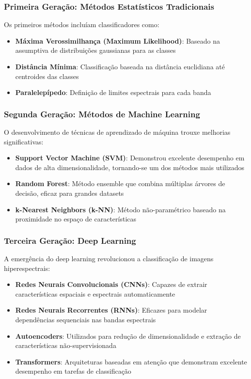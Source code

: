 \subsubsection{Primeira Geração: Métodos Estatísticos Tradicionais}
Os primeiros métodos incluíam classificadores como:
\begin{itemize}
    \item \textbf{Máxima Verossimilhança (Maximum Likelihood)}: Baseado na assumptiva de distribuições gaussianas para as classes
    \item \textbf{Distância Mínima}: Classificação baseada na distância euclidiana até centroides das classes
    \item \textbf{Paralelepípedo}: Definição de limites espectrais para cada banda
\end{itemize}

\subsubsection{Segunda Geração: Métodos de Machine Learning}
O desenvolvimento de técnicas de aprendizado de máquina trouxe melhorias significativas:
\begin{itemize}
    \item \textbf{Support Vector Machine (SVM)}: Demonstrou excelente desempenho em dados de alta dimensionalidade, tornando-se um dos métodos mais utilizados \cite{Lou2024}
    \item \textbf{Random Forest}: Método ensemble que combina múltiplas árvores de decisão, eficaz para grandes datasets \cite{Lou2024}
    \item \textbf{k-Nearest Neighbors (k-NN)}: Método não-paramétrico baseado na proximidade no espaço de características
\end{itemize}

\subsubsection{Terceira Geração: Deep Learning}
A emergência do deep learning revolucionou a classificação de imagens hiperespectrais:
\begin{itemize}
    \item \textbf{Redes Neurais Convolucionais (CNNs)}: Capazes de extrair características espaciais e espectrais automaticamente
    \item \textbf{Redes Neurais Recorrentes (RNNs)}: Eficazes para modelar dependências sequenciais nas bandas espectrais
    \item \textbf{Autoencoders}: Utilizados para redução de dimensionalidade e extração de características não-supervisionada
    \item \textbf{Transformers}: Arquiteturas baseadas em atenção que demonstram excelente desempenho em tarefas de classificação \cite{Lou2024}
\end{itemize}

